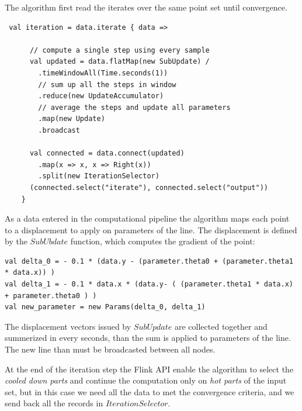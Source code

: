 The algorithm first read the iterates over the same point set until convergence. 
\begin{lstlisting}
 val iteration = data.iterate { data =>
      
      // compute a single step using every sample
      val updated = data.flatMap(new SubUpdate) /
        .timeWindowAll(Time.seconds(1))
        // sum up all the steps in window
        .reduce(new UpdateAccumulator) 
        // average the steps and update all parameters
        .map(new Update)
        .broadcast

      val connected = data.connect(updated)
        .map(x => x, x => Right(x))
        .split(new IterationSelector)
      (connected.select("iterate"), connected.select("output"))
    }
\end{lstlisting}
As a data entered in the computational pipeline the algorithm maps each point to a displacement to apply on parameters of the line. The displacement is defined by the $SubUbdate$ function, which computes the gradient of the point:
\begin{lstlisting}
val delta_0 = - 0.1 * (data.y - (parameter.theta0 + (parameter.theta1 * data.x)) )
val delta_1 = - 0.1 * data.x * (data.y- ( (parameter.theta1 * data.x) + parameter.theta0 ) )
val new_parameter = new Params(delta_0, delta_1)
\end{lstlisting}
The displacement vectors issued by $SubUpdate$ are collected together and summerized in every seconds, than the sum is applied to parameters of the line. The new line than must be broadcasted between all nodes.

At the end of the iteration step the Flink API enable the algorithm to select the \textit{cooled down parts} and continue the computation only on \textit{hot parts} of the input set, but in this case we need all the data to met the convergence criteria, and we send back all the records in $IterationSelector$.    


 
      
